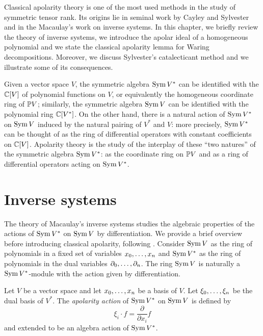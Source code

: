 Classical apolarity theory is one of the most used methods in the study of symmetric tensor rank. Its origins lie in seminal work by Cayley \cite{Cay45} and Sylvester \cite{Syl52,Syl53} and in the Macaulay's work on inverse systems. In this chapter, we briefly review the theory of inverse systems, we introduce the apolar ideal of a homogeneous polynomial and we state the classical apolarity lemma for Waring decompositions. Moreover, we discuss Sylvester's catalecticant method and we illustrate some of its consequences.

Given a vector space $V$, the symmetric algebra $\operatorname{Sym} V^*$ can be identified with the $\mathbb{C}[V]$ of polynomial functions on $V$, or equivalently the homogeneous coordinate ring of $\mathbb{P} V$; similarly, the symmetric algebra $\operatorname{Sym} V$ can be identified with the polynomial ring $\mathbb{C}[V^*]$. On the other hand, there is a natural action of $\operatorname{Sym} V^*$ on $\operatorname{Sym} V$ induced by the natural pairing of $V^*$ and $V$: more precisely, $\operatorname{Sym} V^*$ can be thought of as the ring of differential operators with constant coefficients on $\mathbb{C}[V]$. Apolarity theory is the study of the interplay of these ``two natures'' of the symmetric algebra $\operatorname{Sym} V^*$: as the coordinate ring on $\mathbb{P} V$ and as a ring of differential operators acting on $\operatorname{Sym} V^*$.

\section{Inverse systems}
\label{apolarity-section-inverseSystems}
The theory of Macaulay's inverse systems studies the algebraic properties of the actions of $\operatorname{Sym} V^*$ on $\operatorname{Sym} V$ by differentiation. We provide a brief overview before introducing classical apolarity, following \cite{Ger96}. Consider $\operatorname{Sym} V$ as the ring of polynomials in a fixed set of variables $x_0 , \ldots , x_n$ and $\operatorname{Sym} V^*$ as the ring of polynomials in the dual variables $\partial_0 , \ldots , \partial_n$. The ring $\operatorname{Sym} V$ is naturally a $\operatorname{Sym} V^*$-module with the action given by differentiation.

\begin{definition}
\label{apolarity-definition-apolarityAction}
Let $V$ be a vector space and let $x_0 , \ldots , x_n$ be a basis of $V$. Let $\xi_0 , \ldots , \xi_n$ be the dual basis of $V^*$. The {\it apolarity action} of $\operatorname{Sym} V^*$ on $\operatorname{Sym} V$ is defined by 
\[
\xi_i \cdot f = \frac{\partial}{\partial x_i}f
\]
and extended to be an algebra action of $\operatorname{Sym} V^*$. 
\end{definition}

